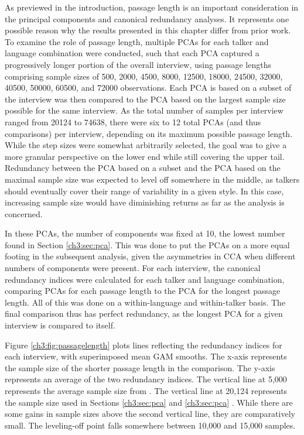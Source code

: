 As previewed in the introduction, passage length is an important consideration in the principal components and canonical redundancy analyses. It represents one possible reason why the results presented in this chapter differ from prior work. To examine the role of passage length, multiple PCAs for each talker and language combination were conducted, such that each PCA captured a progressively longer portion of the overall interview, using passage lengths comprising sample sizes of 500, 2000, 4500, 8000, 12500, 18000, 24500, 32000, 40500, 50000, 60500, and 72000 observations. Each PCA is based on a subset of the interview was then compared to the PCA based on the largest sample size possible for the same interview. As the total number of samples per interview ranged from 20124 to 74638, there were six to 12 total PCAs (and thus comparisons) per interview, depending on its maximum possible passage length. While the step sizes were somewhat arbitrarily selected, the goal was to give a more granular perspective on the lower end while still covering the upper tail. Redundancy between the PCA based on a subset and the PCA based on the maximal sample size was expected to level off somewhere in the middle, as talkers should eventually cover their range of variability in a given style. In this case, increasing sample size would have diminishing returns as far as the analysis is concerned. 

In these PCAs, the number of components was fixed at 10, the lowest number found in Section \ref{ch3:sec:pca}. This was done to put the PCAs on a more equal footing in the subsequent analysis, given the asymmetries in CCA when different numbers of components were present. For each interview, the canonical redundancy indices were calculated for each talker and language combination, comparing PCAs for each passage length to the PCA for the longest passage length. All of this was done on a within-language and within-talker basis. The final comparison thus has perfect redundancy, as the longest PCA for a given interview is compared to itself.

Figure \ref{ch3:fig:passagelength} plots lines reflecting the redundancy indices for each interview, with superimposed mean GAM smooths. The x-axis represents the sample size of the shorter passage length in the comparison. The y-axis represents an average of the two redundancy indices. The vertical line at 5,000 represents the average sample size from \citet{lee_2019_acoustic}. The vertical line at 20,124 represents the sample size used in Sections \ref{ch3:sec:pca} and \ref{ch3:sec:pca} . While there are some gains in sample sizes above the second vertical line, they are comparatively small. The leveling-off point falls somewhere between 10,000 and 15,000 samples. 

